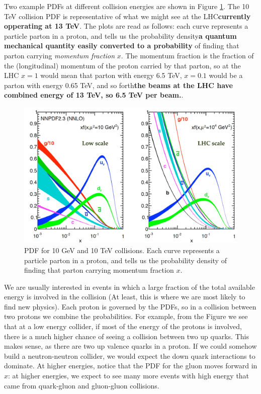 Two example PDFs at different collision energies are shown in Figure \ref{Fig:Detect:PDFset}. The 10 TeV collision PDF is representative of what we might see at the LHC\textbf{currently opperating at 13 TeV}. The plots are read as follows: each curve represents a particle parton in a proton, and tells us the probability density\textbf{a quantum mechanical quantity easily converted to a probability} of finding that parton carrying \textit{momentum fraction} $x$. The momentum fraction is the fraction of the (longitudinal) momentum of the proton carried by that parton, so at the LHC $x=1$ would mean that parton with energy 6.5 TeV, $x=0.1$ would be a parton with energy 0.65 TeV, and so forth\textbf{the beams at the LHC have combined energy of 13 TeV, so 6.5 TeV per beam.}.
\begin{figure}[h!]
    \centering
        \includegraphics[width=\textwidth]{F3/PDFset}
        \caption{PDF for 10 GeV and 10 TeV collisions. Each curve represents a particle parton in a proton, and tells us the probability density of finding that parton carrying momentum fraction $x$.}
        \label{Fig:Detect:PDFset}
\end{figure}
We are usually interested in events in which a large fraction of the total available energy is involved in the collision (At least, this is where we are most likely to find new physics). Each proton is governed by the PDFs, so in a collision between two protons we combine the probabilities. For example, from the Figure we see that at a low energy collider, if most of the energy of the protons is involved, there is a much higher chance of seeing a collision between two up quarks. This makes sense, as there are two up valence quarks in a proton. If we could somehow build a neutron-neutron collider, we would expect the down quark interactions to dominate. At higher energies, notice that the PDF for the gluon moves forward in $x$: at higher energies, we expect to see many more events with high energy that came from quark-gluon and gluon-gluon collisions.

